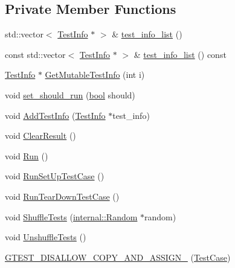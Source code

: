 \subsection*{Private Member Functions}
\begin{DoxyCompactItemize}
\item 
std\+::vector$<$ \hyperlink{classtesting_1_1TestInfo}{Test\+Info} $\ast$ $>$ \& \hyperlink{classtesting_1_1TestCase_adbfcf952eb18dc82d4b20f6bc31aee04}{test\+\_\+info\+\_\+list} ()
\item 
const std\+::vector$<$ \hyperlink{classtesting_1_1TestInfo}{Test\+Info} $\ast$ $>$ \& \hyperlink{classtesting_1_1TestCase_a7b4460807b77fd63922528a76daf38ba}{test\+\_\+info\+\_\+list} () const
\item 
\hyperlink{classtesting_1_1TestInfo}{Test\+Info} $\ast$ \hyperlink{classtesting_1_1TestCase_aee03569f8ecb89cfe479e71f11edc3ea}{Get\+Mutable\+Test\+Info} (int i)
\item 
void \hyperlink{classtesting_1_1TestCase_a58ecf00d6682b83caef887682b6012f0}{set\+\_\+should\+\_\+run} (\hyperlink{classbool}{bool} should)
\item 
void \hyperlink{classtesting_1_1TestCase_a21ca9697c5f91554c752411f8ea556cf}{Add\+Test\+Info} (\hyperlink{classtesting_1_1TestInfo}{Test\+Info} $\ast$test\+\_\+info)
\item 
void \hyperlink{classtesting_1_1TestCase_a4d0498738f8903130a8d0400932e8b54}{Clear\+Result} ()
\item 
void \hyperlink{classtesting_1_1TestCase_a6f5b3724cd5a8e446cd48a6150d08cde}{Run} ()
\item 
void \hyperlink{classtesting_1_1TestCase_a10763d318d617f921803741ec81919c5}{Run\+Set\+Up\+Test\+Case} ()
\item 
void \hyperlink{classtesting_1_1TestCase_a23563c9cbbd004159c6acef2af0e7c39}{Run\+Tear\+Down\+Test\+Case} ()
\item 
void \hyperlink{classtesting_1_1TestCase_ac26160e2aeb3d8c86b611843c5abdb29}{Shuffle\+Tests} (\hyperlink{classtesting_1_1internal_1_1Random}{internal\+::\+Random} $\ast$random)
\item 
void \hyperlink{classtesting_1_1TestCase_ad54a66cd65b4420c960d6db79b7cadf6}{Unshuffle\+Tests} ()
\item 
\hyperlink{classtesting_1_1TestCase_a00a4ea337b43015c71874ece0de58db7}{G\+T\+E\+S\+T\+\_\+\+D\+I\+S\+A\+L\+L\+O\+W\+\_\+\+C\+O\+P\+Y\+\_\+\+A\+N\+D\+\_\+\+A\+S\+S\+I\+G\+N\+\_\+} (\hyperlink{classtesting_1_1TestCase}{Test\+Case})
\end{DoxyCompactItemize}
